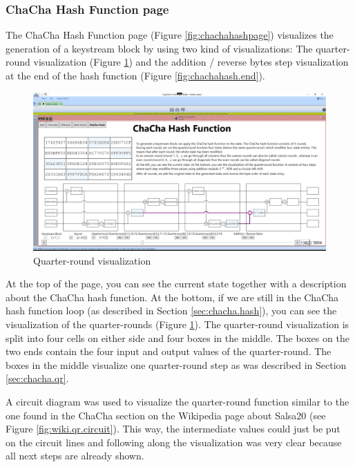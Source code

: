 \subsubsection{ChaCha Hash Function page}

The ChaCha Hash Function page (Figure \ref{fig:chachahashpage}) visualizes the generation of a keystream block by using two kind of visualizations: The quarter-round visualization (Figure \ref{fig:chachahash.mid.qr}) and the addition / reverse bytes step visualization at the end of the hash function (Figure \ref{fig:chachahash.end}).

\begin{figure}
  \centering
  \includegraphics[width=\textwidth]{figures/ct2/chachahash/chachahash-mid-qr.png}
  \caption{Quarter-round visualization}
  \label{fig:chachahash.mid.qr}
\end{figure}

At the top of the page, you can see the current state together with a description about the ChaCha hash function. At the bottom, if we are still in the ChaCha hash function loop (as described in Section \ref{sec:chacha.hash}), you can see the visualization of the quarter-rounds (Figure \ref{fig:chachahash.mid.qr}). The quarter-round visualization is split into four cells on either side and four boxes in the middle. The boxes on the two ends contain the four input and output values of the quarter-round. The boxes in the middle visualize one quarter-round step as was described in Section \ref{sec:chacha.qr}.

A circuit diagram was used to visualize the quarter-round function similar to the one found in the ChaCha section on the Wikipedia page about Salsa20 (see Figure \ref{fig:wiki.qr.circuit}). This way, the intermediate values could just be put on the circuit lines and following along the visualization was very clear because all next steps are already shown.

